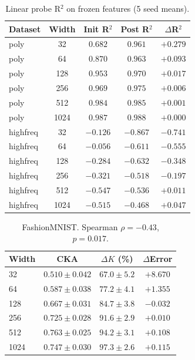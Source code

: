 \documentclass[twoside,11pt]{article}
\begin{document}
\begin{table}[htbp]
    \centering\footnotesize
    \caption{Linear probe R$^2$ on frozen features (5 seed means).}
    \label{tab:linear_probe}
    \begin{tabular}{lcccc}
    \toprule
    Dataset & Width & Init R$^2$ & Post R$^2$ & $\Delta$R$^2$ \\
    \midrule
    poly & 32  & $0.682$ & $0.961$ & $+0.279$ \\
    poly & 64  & $0.870$ & $0.963$ & $+0.093$ \\
    poly & 128 & $0.953$ & $0.970$ & $+0.017$ \\
    poly & 256 & $0.969$ & $0.975$ & $+0.006$ \\
    poly & 512 & $0.984$ & $0.985$ & $+0.001$ \\
    poly & 1024 & $0.987$ & $0.988$ & $+0.000$ \\
    \midrule
    highfreq & 32  & $-0.126$ & $-0.867$ & $-0.741$ \\
    highfreq & 64  & $-0.056$ & $-0.611$ & $-0.555$ \\
    highfreq & 128 & $-0.284$ & $-0.632$ & $-0.348$ \\
    highfreq & 256 & $-0.321$ & $-0.518$ & $-0.197$ \\
    highfreq & 512 & $-0.547$ & $-0.536$ & $+0.011$ \\
    highfreq & 1024 & $-0.515$ & $-0.468$ & $+0.047$ \\
    \bottomrule
    \end{tabular}
\end{table}

\begin{table}[h]
    \centering\footnotesize
    \caption{FashionMNIST. Spearman $\rho=-0.43$, $p=0.017$.}
    \label{tab:fashion}
    \begin{tabular}{lccc}
    \toprule
    Width & CKA & $\Delta K$ (\%) & $\Delta$Error \\
    \midrule
    32   & $0.510\pm0.042$ & $67.0\pm5.2$  & $+8.670$ \\
    64   & $0.587\pm0.038$ & $77.2\pm4.1$  & $+1.355$ \\
    128  & $0.667\pm0.031$ & $84.7\pm3.8$  & $-0.032$ \\
    256  & $0.725\pm0.028$ & $91.6\pm2.9$  & $+0.010$ \\
    512  & $0.763\pm0.025$ & $94.2\pm3.1$  & $+0.108$ \\
    1024 & $0.747\pm0.030$ & $97.3\pm2.6$  & $+0.115$ \\
    \bottomrule
    \end{tabular}
\end{table}
\end{document}
